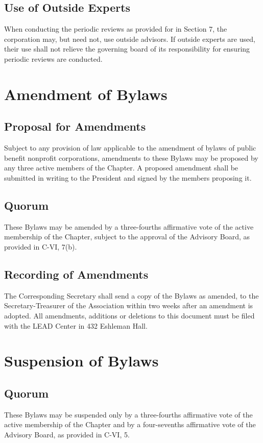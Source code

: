\documentclass{article}
\begin{document}
	\subsection{Use of Outside Experts}
	When conducting the periodic reviews as provided for in Section 7, the corporation may, but need not, use outside advisors. If outside experts are used, their use shall not relieve the governing board of its responsibility for ensuring periodic reviews are conducted.
	
	\section{Amendment of Bylaws}
	\subsection{Proposal for Amendments}
	Subject to any provision of law applicable to the amendment of bylaws of public benefit nonprofit corporations, amendments to these Bylaws may be proposed by any three active members of the Chapter. A proposed amendment shall be submitted in writing to the President and signed by the members proposing it.
	\subsection{Quorum}
	These Bylaws may be amended by a three-fourths affirmative vote of the active membership of the Chapter, subject to the approval of the Advisory Board, as provided in C-VI, 7(b).
	\subsection{Recording of Amendments}
	The Corresponding Secretary shall send a copy of the Bylaws as amended, to the Secretary-Treasurer of the Association within two weeks after an amendment is adopted. All amendments, additions or deletions to this document must be filed with the LEAD Center in 432 Eshleman Hall.
	
	\section{Suspension of Bylaws}
	\subsection{Quorum}
	These Bylaws may be suspended only by a three-fourths affirmative vote of the active membership of the Chapter and by a four-sevenths affirmative vote of the Advisory Board, as provided in C-VI, 5.
	
\end{document}
